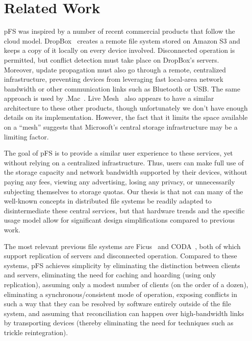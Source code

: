 
\section{Related Work}
\label{s:related}


pFS was inspired by a number of recent commercial products that follow
the cloud model.  DropBox~\cite{houston:dropbox} creates a remote file
system stored on Amazon S3 and keeps a copy of it locally on every
device involved.  Disconnected operation is permitted, but conflict
detection must take place on DropBox's servers.  Moreover, update
propagation must also go through a remote, centralized infrastructure,
preventing devices from leveraging fast local-area network bandwidth
or other communication links such as Bluetooth or USB\@.  The same
approach is used by .Mac~\cite{apple:mac}.  Live
Mesh~\cite{microsoft:livemesh} also appears to have a similar
architecture to these other products, though unfortunately we don't
have enough details on its implementation.  However, the fact that it
limits the space available on a ``mesh'' suggests that Microsoft's
central storage infrastructure may be a limiting factor.

The goal of pFS is to provide a similar user experience to these
services, yet without relying on a centralized infrastructure.  Thus,
users can make full use of the storage capacity and network bandwidth
supported by their devices, without paying any fees, viewing any
advertising, losing any privacy, or unnecessarily subjecting
themselves to storage quotas.  Our thesis is that not can many of the
well-known concepts in distributed file systems be readily adapted to
disintermediate these central services, but that hardware trends and
the specific usage model allow for significant design simplifications
compared to previous work.

The most relevant previous file systems are Ficus~\cite{page:ficus}
and CODA~\cite{kistler:coda}, both of which support replication of
servers and disconnected operation.  Compared to these systems, pFS
achieves simplicity by eliminating the distinction between clients and
servers, eliminating the need for caching and hoarding (using only
replication), assuming only a modest number of clients (on the order
of a dozen), eliminating a synchronous/consistent mode of operation,
exposing conflicts in such a way that they can be resolved by software
entirely outside of the file system, and assuming that reconciliation
can happen over high-bandwidth links by transporting devices (thereby
eliminating the need for techniques such as trickle reintegration).

